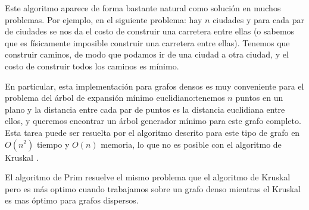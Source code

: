 Este algoritmo  aparece de forma bastante natural como solución  en muchos problemas. Por ejemplo, en el siguiente problema: hay $n$ ciudades y para cada par de ciudades se nos da el costo de construir una carretera entre ellas (o sabemos que es físicamente imposible construir una carretera entre ellas). Tenemos que construir caminos, de modo que podamos ir de una ciudad a otra ciudad, y el costo de construir todos los caminos es mínimo.

En particular, esta implementación para grafos densos es muy conveniente para el problema del árbol de expansión mínimo euclidiano:tenemos $n$ puntos en un plano y la distancia entre cada par de puntos es la distancia euclidiana entre ellos, y queremos encontrar un árbol generador mínimo para este grafo completo. Esta tarea puede ser resuelta por el algoritmo descrito para este tipo de grafo en $O(n^2)$ tiempo y $O(n)$ memoria, lo que no es posible con el algoritmo de Kruskal .

El algoritmo de Prim resuelve el mismo problema que el algoritmo de Kruskal pero es más optimo cuando trabajamos sobre un grafo denso mientras el Kruskal es mas óptimo para grafos dispersos.